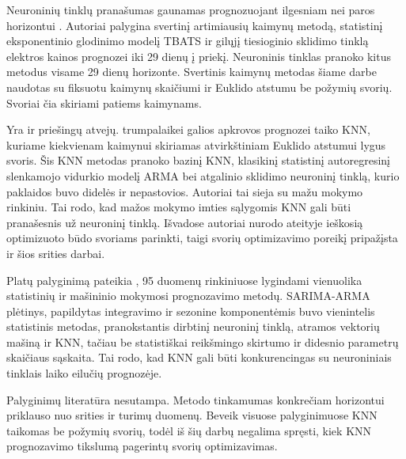 \documentclass[]{VUMIFTemplateClass}
\begin{document}
    Neuroninių tinklų pranašumas gaunamas prognozuojant ilgesniam nei paros horizontui \cite{windler2019}.
    Autoriai palygina svertinį artimiausių kaimynų metodą, statistinį eksponentinio glodinimo modelį TBATS ir gilųjį tiesioginio sklidimo tinklą elektros kainos prognozei iki 29 dienų į priekį.
    Neuroninis tinklas pranoko kitus metodus visame 29 dienų horizonte.
    Svertinis kaimynų metodas šiame darbe naudotas su fiksuotu kaimynų skaičiumi ir Euklido atstumu be požymių svorių.
    Svoriai čia skiriami patiems kaimynams.

    Yra ir priešingų atvejų.
    \cite{fan2019} trumpalaikei galios apkrovos prognozei taiko KNN, kuriame kiekvienam kaimynui skiriamas atvirkštiniam Euklido atstumui lygus svoris.
    Šis KNN metodas pranoko bazinį KNN, klasikinį statistinį autoregresinį slenkamojo vidurkio modelį ARMA bei atgalinio sklidimo neuroninį tinklą, kurio paklaidos buvo didelės ir nepastovios.
    Autoriai tai sieja su mažu mokymo rinkiniu.
    Tai rodo, kad mažos mokymo imties sąlygomis KNN gali būti pranašesnis už neuroninį tinklą.
    Išvadose autoriai nurodo ateityje ieškosią optimizuoto būdo svoriams parinkti, taigi svorių optimizavimo poreikį pripažįsta ir šios srities darbai.

    Platų palyginimą pateikia \cite{parmezan2019}, 95 duomenų rinkiniuose lygindami vienuolika statistinių ir mašininio mokymosi prognozavimo metodų.
    SARIMA-ARMA plėtinys, papildytas integravimo ir sezonine komponentėmis buvo vienintelis statistinis metodas, pranokstantis dirbtinį neuroninį tinklą, atramos vektorių mašiną ir KNN, tačiau be statistiškai reikšmingo skirtumo ir didesnio parametrų skaičiaus sąskaita.
    Tai rodo, kad KNN gali būti konkurencingas su neuroniniais tinklais laiko eilučių prognozėje.

    Palyginimų literatūra nesutampa.
    Metodo tinkamumas konkrečiam horizontui priklauso nuo srities ir turimų duomenų.
    Beveik visuose palyginimuose KNN taikomas be požymių svorių, todėl iš šių darbų negalima spręsti, kiek KNN prognozavimo tikslumą pagerintų svorių optimizavimas.

\end{document}
